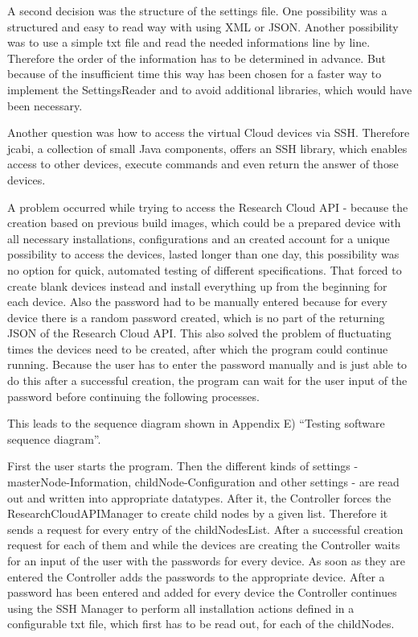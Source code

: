A second decision was the structure of the settings file. One possibility was a structured and easy to read way with using XML or JSON. Another possibility was to use a simple txt file and read the needed informations line by line. Therefore the order of the information has to be determined in advance. But because of the insufficient time this way has been chosen for a faster way to implement the SettingsReader and to avoid additional libraries, which would have been necessary.

Another question was how to access the virtual Cloud devices via SSH. Therefore jcabi, a collection of small Java components, offers an SSH library, which enables access to other devices, execute commands and even return the answer of those devices.

A problem occurred while trying to access the Research Cloud API - because the creation based on previous build images, which could be a prepared device with all necessary installations, configurations and an created account for a unique possibility to access the devices, lasted longer than one day, this possibility was no option for quick, automated testing of different specifications. That forced to create blank devices instead and install everything up from the beginning for each device. Also the password had to be manually entered because for every device there is a random password created, which is no part of the returning JSON of the Research Cloud API. This also solved the problem of fluctuating times the devices need to be created, after which the program could continue running. Because the user has to enter the password manually and is just able to do this after a successful creation, the program can wait for the user input of the password before continuing the following processes.

This leads to the sequence diagram shown in Appendix E) ``Testing software sequence diagram''.

First the user starts the program. Then the different kinds of settings - masterNode-Information, childNode-Configuration and other settings - are read out and written into appropriate datatypes. After it, the Controller forces the ResearchCloudAPIManager to create child nodes by a given list. Therefore it sends a request for every entry of the childNodesList. After a successful creation request for each of them and while the devices are creating the Controller waits for an input of the user with the passwords for every device. As soon as they are entered the Controller adds the passwords to the appropriate device. After a password has been entered and added for every device the Controller continues using the SSH Manager to perform all installation actions defined in a configurable txt file, which first has to be read out, for each of the childNodes.

